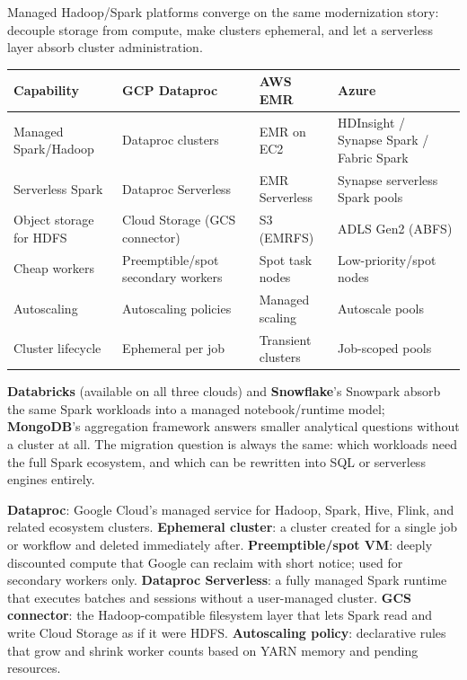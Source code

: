 \begin{crosscloud}
Managed Hadoop/Spark platforms converge on the same modernization story: decouple storage from compute, make clusters ephemeral, and let a serverless layer absorb cluster administration.

\vspace{2mm}
{\footnotesize
\begin{tabular}{@{}p{2.8cm}p{3.0cm}p{3.0cm}p{3.0cm}@{}} \\
\toprule
\textbf{Capability} & \textbf{GCP Dataproc} & \textbf{AWS EMR} & \textbf{Azure} \\
\midrule
Managed Spark/Hadoop & Dataproc clusters & EMR on EC2 & HDInsight / Synapse Spark / Fabric Spark \\
Serverless Spark & Dataproc Serverless & EMR Serverless & Synapse serverless Spark pools \\
Object storage for HDFS & Cloud Storage (GCS connector) & S3 (EMRFS) & ADLS Gen2 (ABFS) \\
Cheap workers & Preemptible/spot secondary workers & Spot task nodes & Low-priority/spot nodes \\
Autoscaling & Autoscaling policies & Managed scaling & Autoscale pools \\
Cluster lifecycle & Ephemeral per job & Transient clusters & Job-scoped pools \\
\bottomrule
\end{tabular}}

\vspace{1mm}
\textbf{Databricks} (available on all three clouds) and \textbf{Snowflake}'s Snowpark absorb the same Spark workloads into a managed notebook/runtime model; \textbf{MongoDB}'s aggregation framework answers smaller analytical questions without a cluster at all. The migration question is always the same: which workloads need the full Spark ecosystem, and which can be rewritten into SQL or serverless engines entirely.
\end{crosscloud}

\begin{keyterms}
\textbf{Dataproc}: Google Cloud's managed service for Hadoop, Spark, Hive, Flink, and related ecosystem clusters.
\textbf{Ephemeral cluster}: a cluster created for a single job or workflow and deleted immediately after.
\textbf{Preemptible/spot VM}: deeply discounted compute that Google can reclaim with short notice; used for secondary workers only.
\textbf{Dataproc Serverless}: a fully managed Spark runtime that executes batches and sessions without a user-managed cluster.
\textbf{GCS connector}: the Hadoop-compatible filesystem layer that lets Spark read and write Cloud Storage as if it were HDFS.
\textbf{Autoscaling policy}: declarative rules that grow and shrink worker counts based on YARN memory and pending resources.
\end{keyterms}


